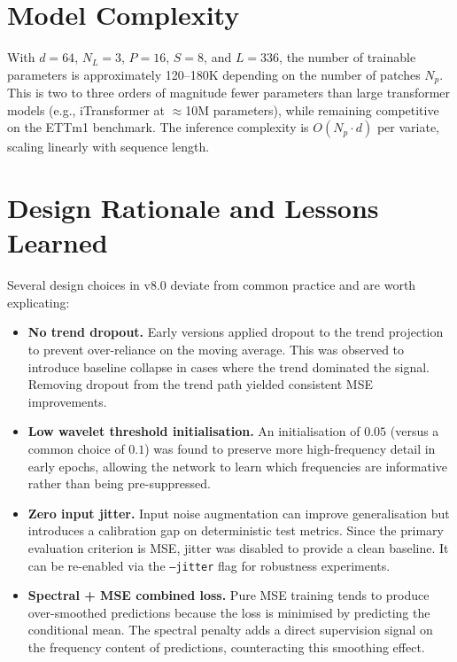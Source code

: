 \documentclass[11pt, letterpaper]{article}
\begin{document}
\section{Model Complexity}
\label{sec:complexity}

With $d = 64$, $N_L = 3$, $P = 16$, $S = 8$, and $L = 336$, the number of trainable parameters is approximately 120--180K depending on the number of patches $N_p$. This is two to three orders of magnitude fewer parameters than large transformer models (e.g., iTransformer at $\approx$10M parameters), while remaining competitive on the ETTm1 benchmark. The inference complexity is $O(N_p \cdot d)$ per variate, scaling linearly with sequence length.

\section{Design Rationale and Lessons Learned}
\label{sec:lessons}

Several design choices in v8.0 deviate from common practice and are worth explicating:

\begin{itemize}
  \item \textbf{No trend dropout.} Early versions applied dropout to the trend projection to prevent over-reliance on the moving average. This was observed to introduce baseline collapse in cases where the trend dominated the signal. Removing dropout from the trend path yielded consistent MSE improvements.
  \item \textbf{Low wavelet threshold initialisation.} An initialisation of $0.05$ (versus a common choice of $0.1$) was found to preserve more high-frequency detail in early epochs, allowing the network to learn which frequencies are informative rather than being pre-suppressed.
  \item \textbf{Zero input jitter.} Input noise augmentation can improve generalisation but introduces a calibration gap on deterministic test metrics. Since the primary evaluation criterion is MSE, jitter was disabled to provide a clean baseline. It can be re-enabled via the \texttt{--jitter} flag for robustness experiments.
  \item \textbf{Spectral + MSE combined loss.} Pure MSE training tends to produce over-smoothed predictions because the loss is minimised by predicting the conditional mean. The spectral penalty adds a direct supervision signal on the frequency content of predictions, counteracting this smoothing effect.
\end{itemize}
\end{document}

